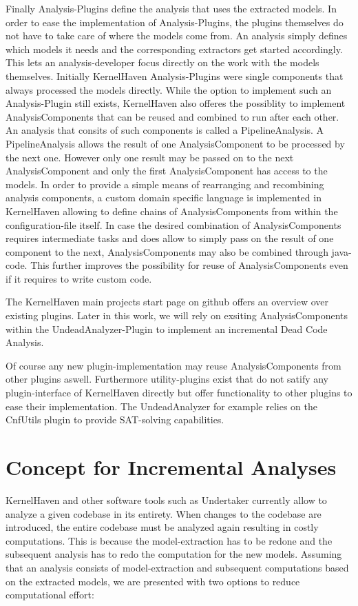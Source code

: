 \documentclass[a4paper]{article}
\begin{document}
Finally Analysis-Plugins define the analysis that uses the extracted models. In order to ease the implementation of Analysis-Plugins, the plugins themselves do not have to take care of where the models come from. An analysis simply defines which models it needs and the corresponding extractors get started accordingly. This lets an analysis-developer focus directly on the work with the models themselves. Initially KernelHaven Analysis-Plugins  were single components that always processed the models directly. While the option to implement such an Analysis-Plugin still exists, KernelHaven also offeres the possiblity to implement AnalysisComponents that can be reused and combined to run after each other. An analysis that consits of such components is called a PipelineAnalysis. A PipelineAnalysis allows the result of one AnalysisComponent to be processed by the next one.  However only one result may be passed on to the next AnalysisComponent and only the first AnalysisComponent has access to the models. In order to provide a simple means of rearranging and recombining analysis components, a custom domain specific language is implemented in KernelHaven allowing to define chains of AnalysisComponents from within the configuration-file itself. In case the desired combination of AnalysisComponents requires intermediate tasks and does allow to simply pass on the result of one component to the next, AnalysisComponents may also be combined through java-code. This further improves the possibility for reuse of AnalysisComponents even if it requires to write custom code.

The KernelHaven main projects start page on github offers an overview over existing plugins. Later in this work, we will rely on exsiting AnalysisComponents within the UndeadAnalyzer-Plugin to implement an incremental Dead Code Analysis.

Of course any new plugin-implementation may reuse AnalysisComponents from other plugins aswell. Furthermore utility-plugins exist that do not satify any plugin-interface of KernelHaven directly but offer functionality to other plugins to ease their implementation. The UndeadAnalyzer for example relies on the CnfUtils plugin to provide SAT-solving capabilities.

\newpage
\section{Concept for Incremental Analyses}\label{concept}

KernelHaven and other software tools such as Undertaker\cite{Tartler:2011:FCC:1966445.1966451} currently allow to analyze a given codebase in its entirety. When changes to the codebase are introduced, the entire codebase must be analyzed again resulting in costly computations. This is because the model-extraction has to be redone and the subsequent analysis has to redo the computation for the new models. Assuming that an analysis consists of model-extraction and subsequent computations based on the extracted models, we are presented with two options to reduce computational effort:
\end{document}
